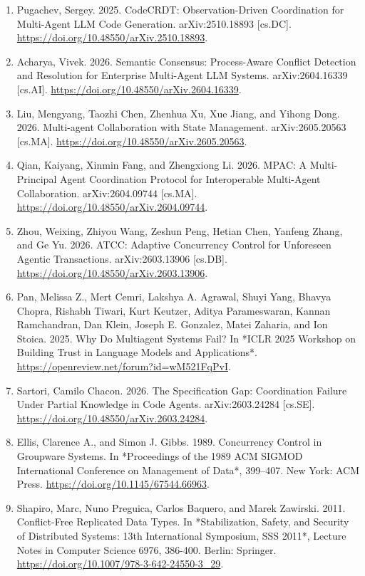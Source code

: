 \documentclass[9pt,letterpaper]{extarticle}
\begin{document}
\begin{enumerate}
\item \label{ref:1} Pugachev, Sergey. 2025. {}CodeCRDT: Observation-Driven Coordination for Multi-Agent LLM Code Generation.{} arXiv:2510.18893 [cs.DC]. \url{https://doi.org/10.48550/arXiv.2510.18893}.
\item \label{ref:2} Acharya, Vivek. 2026. {}Semantic Consensus: Process-Aware Conflict Detection and Resolution for Enterprise Multi-Agent LLM Systems.{} arXiv:2604.16339 [cs.AI]. \url{https://doi.org/10.48550/arXiv.2604.16339}.
\item \label{ref:3} Liu, Mengyang, Taozhi Chen, Zhenhua Xu, Xue Jiang, and Yihong Dong. 2026. {}Multi-agent Collaboration with State Management.{} arXiv:2605.20563 [cs.MA]. \url{https://doi.org/10.48550/arXiv.2605.20563}.
\item \label{ref:4} Qian, Kaiyang, Xinmin Fang, and Zhengxiong Li. 2026. {}MPAC: A Multi-Principal Agent Coordination Protocol for Interoperable Multi-Agent Collaboration.{} arXiv:2604.09744 [cs.MA]. \url{https://doi.org/10.48550/arXiv.2604.09744}.
\item \label{ref:5} Zhou, Weixing, Zhiyou Wang, Zeshun Peng, Hetian Chen, Yanfeng Zhang, and Ge Yu. 2026. {}ATCC: Adaptive Concurrency Control for Unforeseen Agentic Transactions.{} arXiv:2603.13906 [cs.DB]. \url{https://doi.org/10.48550/arXiv.2603.13906}.
\item \label{ref:6} Pan, Melissa Z., Mert Cemri, Lakshya A. Agrawal, Shuyi Yang, Bhavya Chopra, Rishabh Tiwari, Kurt Keutzer, Aditya Parameswaran, Kannan Ramchandran, Dan Klein, Joseph E. Gonzalez, Matei Zaharia, and Ion Stoica. 2025. {}Why Do Multiagent Systems Fail?{} In *ICLR 2025 Workshop on Building Trust in Language Models and Applications*. \url{https://openreview.net/forum?id=wM521FqPvI}.
\item \label{ref:7} Sartori, Camilo Chacon. 2026. {}The Specification Gap: Coordination Failure Under Partial Knowledge in Code Agents.{} arXiv:2603.24284 [cs.SE]. \url{https://doi.org/10.48550/arXiv.2603.24284}.
\item \label{ref:8} Ellis, Clarence A., and Simon J. Gibbs. 1989. {}Concurrency Control in Groupware Systems.{} In *Proceedings of the 1989 ACM SIGMOD International Conference on Management of Data*, 399--407. New York: ACM Press. \url{https://doi.org/10.1145/67544.66963}.
\item \label{ref:9} Shapiro, Marc, Nuno Preguica, Carlos Baquero, and Marek Zawirski. 2011. {}Conflict-Free Replicated Data Types.{} In *Stabilization, Safety, and Security of Distributed Systems: 13th International Symposium, SSS 2011*, Lecture Notes in Computer Science 6976, 386-400. Berlin: Springer. \url{https://doi.org/10.1007/978-3-642-24550-3_29}.

\end{enumerate}
\end{document}
